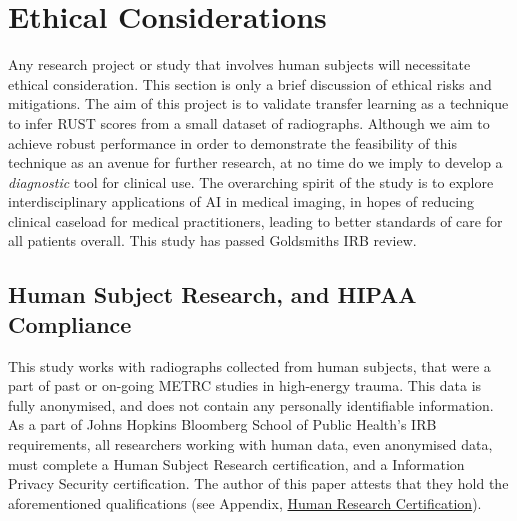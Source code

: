 
\section{Ethical Considerations}

Any research project or study that involves human subjects will necessitate ethical consideration. This section is only a brief discussion of ethical risks and mitigations. The aim of this project is to validate transfer learning as a technique to infer RUST scores from a small dataset of radiographs. Although we aim to achieve robust performance in order to demonstrate the feasibility of this technique as an avenue for further research, at no time do we imply to develop a \emph{diagnostic} tool for clinical use. The overarching spirit of the study is to explore interdisciplinary applications of AI in medical imaging, in hopes of reducing clinical caseload for medical practitioners, leading to better standards of care for all patients overall. This study has passed Goldsmiths IRB review.

\subsection{Human Subject Research, and HIPAA Compliance}
This study works with radiographs collected from human subjects, that were a part of past or on-going METRC studies in high-energy trauma. This data is fully anonymised, and does not contain any personally identifiable information. As a part of Johns Hopkins Bloomberg School of Public Health's IRB requirements, all researchers working with human data, even anonymised data, must complete a Human Subject Research certification, and a Information Privacy Security certification. The author of this paper attests that they hold the aforementioned qualifications (see Appendix, \hyperref[sec:compliance]{Human Research Certification}).